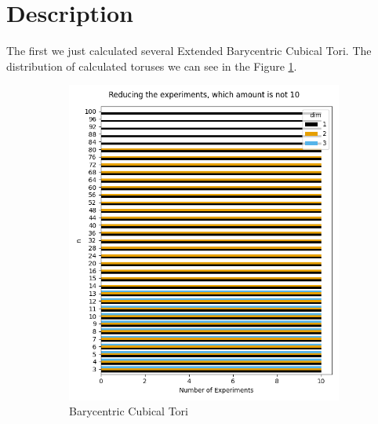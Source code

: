 \documentclass{article}
\begin{document}
\section{Description}
\par The first we just calculated several Extended Barycentric Cubical Tori. The distribution of calculated toruses we can see in the Figure \ref{fig:cases_distribution}.
\begin{figure}[htbp]
    \centering
    \begin{subfigure}[t]{0.45\textwidth}
        \centering
        \includegraphics[width=\textwidth]{pics/extended torus scores/cases.png}
        \caption{Barycentric Cubical Tori}
        \label{fig:cases_distribution}
    \end{subfigure}
    \hfill
    \begin{subfigure}[t]{0.45\textwidth}
        \centering

\end{subfigure}
\end{figure}
\end{document}
